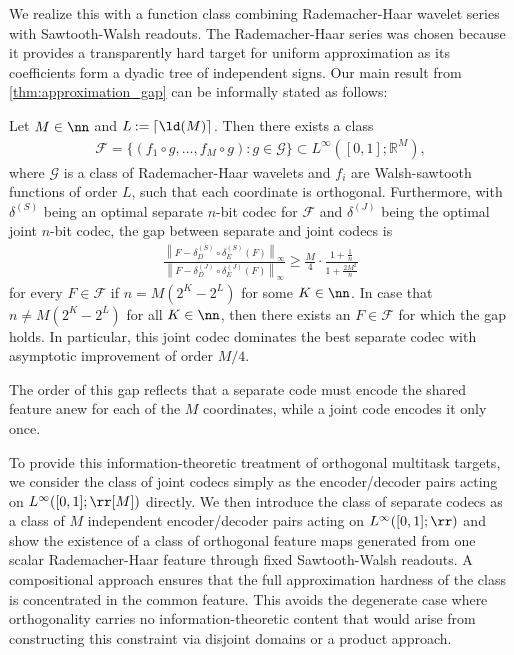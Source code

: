 \documentclass[twoside,11pt]{article}
\newcommand{\defeq}{\mathbin{:=}}
\newcommand{\set}[1]{\ensuremath{\mathcal{#1}}}
\begin{document}
We realize this with a function class combining Rademacher-Haar wavelet series with Sawtooth-Walsh readouts.
The Rademacher-Haar series was chosen because it provides a transparently hard target for uniform approximation as its coefficients form a dyadic tree of independent signs.
Our main result from \cref{thm:approximation_gap} can be informally stated as follows:
\begin{theorem}[Informal]
    Let $M\in\nn$ and $L\defeq\lceil\ld(M)\rceil$. Then there exists a class 
    \begin{align*}
        \mathcal{F} = \{(f_1 \circ g, \ldots, f_M \circ g)\colon g \in \set{G}\} \subset L^\infty([0,1];\mathbb{R}^M),
    \end{align*}
    where $\set{G}$ is a class of Rademacher-Haar wavelets and $f_i$ are Walsh-sawtooth functions of order $L$, such that each coordinate is orthogonal.
    Furthermore, with $\delta^{(S)}$ being an optimal separate $n$-bit codec for $\mathcal{F}$ and $\delta^{(J)}$ being the optimal joint $n$-bit codec,
    the gap between separate and joint codecs is
    \begin{align*}
        \frac{
            \left\|F-\delta^{(S)}_D\circ \delta_E^{(S)}(F)\right\|_{\infty}
        }{
            \left\|F-\delta_D^{(J)}\circ \delta_E^{(J)}(F)\right\|_{\infty}
        }
        \geq
        \frac{M}{4}\cdot \frac{1+\frac1n}{1+\frac{2M^2}{n}}
    \end{align*}
    for every $F\in\set{F}$ if $n=M(2^K-2^L)$ for some $K\in\nn$.
    In case that $n\neq M(2^K-2^L)$ for all $K\in\nn$, then there exists an $F\in\set{F}$ for which the gap holds.
    In particular, this joint codec dominates the best separate codec with asymptotic improvement of order $M / 4$.
\end{theorem}
The order of this gap reflects that a separate code must encode the shared feature anew for each of the $M$ coordinates, while a joint code encodes it only once.

To provide this information-theoretic treatment of orthogonal multitask targets, we consider the class of joint codecs simply as the encoder/decoder pairs acting on $L^{\infty}([0,1];\rr[M])$ directly.
We then introduce the class of separate codecs as a class of $M$ independent encoder/decoder pairs acting on $L^\infty([0,1];\rr)$ and show the existence of a class of orthogonal feature maps generated from one scalar Rademacher-Haar feature through fixed Sawtooth-Walsh readouts.
A compositional approach ensures that the full approximation hardness of the class is concentrated in the common feature.
This avoids the degenerate case where orthogonality carries no information-theoretic content that would arise from constructing this constraint via disjoint domains or a product approach.
\end{document}
